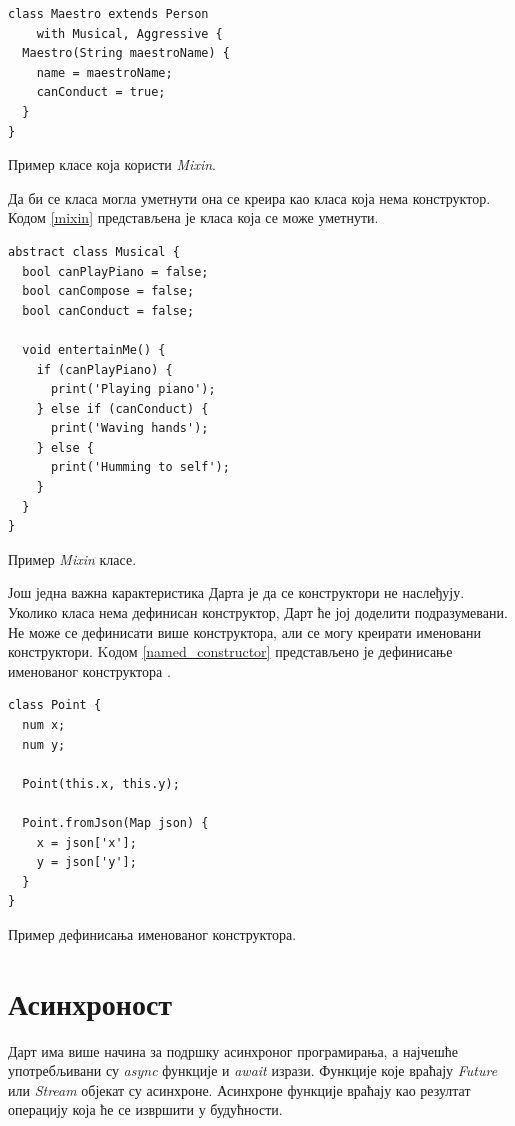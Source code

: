 \documentclass[12pt,oneside]{memoir}
\begin{document}
\begin{listing}
\begin{verbatim}
class Maestro extends Person
    with Musical, Aggressive {
  Maestro(String maestroName) {
    name = maestroName;
    canConduct = true;
  }
}
\end{verbatim}
\caption{Пример класе која користи \textit{Mixin}.}
\label{usemixin}
\end{listing}

Да би се класа могла уметнути она се креира као класа која нема конструктор. Кодом \ref{mixin} представљена је класа која се може уметнути.

\begin{listing}
\begin{verbatim}
abstract class Musical {
  bool canPlayPiano = false;
  bool canCompose = false;
  bool canConduct = false;

  void entertainMe() {
    if (canPlayPiano) {
      print('Playing piano');
    } else if (canConduct) {
      print('Waving hands');
    } else {
      print('Humming to self');
    }
  }
}
\end{verbatim}
\caption{Пример \textit{Mixin} класе.}
\label{mixin}
\end{listing}

Још једна важна карактеристика Дарта је да се конструктори не наслеђују. Уколико класа нема дефинисан конструктор, Дарт ће јој доделити подразумевани. Не може се дефинисати више конструктора, али се могу креирати именовани конструктори. Kодом \ref{named_constructor} представљено је дефинисање именованог конструктора \cite{dart, dart1}.
\begin{listing}
\begin{verbatim}
class Point {
  num x;
  num y;

  Point(this.x, this.y);

  Point.fromJson(Map json) {
    x = json['x'];
    y = json['y'];
  }
}
\end{verbatim}
\caption{Пример дефинисања именованог конструктора.}
\label{named_constructor}
\end{listing}

\section{Асинхроност}
\label{asinhronost}
Дарт има више начина за подршку асинхроног програмирања, а најчешће употребљивани су \textit{async} функције и \textit{await} изрази. Функције које враћају \textit{Future} или \textit{Stream} објекат су асинхроне. Асинхроне функције враћају као резултат операцију која ће се извршити у будућности.
\end{document}
